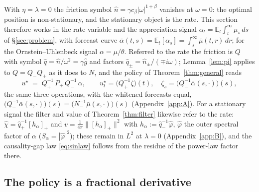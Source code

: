 \documentclass[11pt]{article}
\newcommand{\E}{\mathbb{E}}
\newcommand{\pluspart}[1]{\left[#1\right]_+}
\theoremstyle{plain}
\theoremstyle{definition}
\theoremstyle{remark}
\begin{document}
With $\eta=\lambda=0$ the friction symbol $\hat n=\gamma c_\beta|\omega|^{1+\beta}$ vanishes at $\omega=0$: the optimal position is non-stationary, and the stationary object is the rate. This section therefore works in the rate variable and the appreciation signal $\alpha_t=\E_t\int_t^\infty\mu_s\,ds$ of \S\ref{sec:problem}, with forecast curve $\bar\alpha(t,s)=\E_t[\alpha_s]=\int_s^\infty\bar\mu(t,r)\,dr$; for the Ornstein--Uhlenbeck signal $\alpha=\mu/\theta$. Referred to the rate the friction is $Q$ with symbol $\hat q=\hat n/\omega^2=\gamma\hat g$ and factors $\hat q_\pm=\hat n_\pm/(\mp i\omega)$; Lemma~\ref{lem:pi} applies to $Q=Q_-Q_+$ as it does to $N$, and the policy of Theorem~\ref{thm:general} reads
\begin{equation}\label{eq:rate-policy}
u^\star \;=\; Q_+^{-1}\,P_+\,Q_-^{-1}\,\alpha,
\qquad
u^\star_t=\bigl(Q_+^{-1}\zeta\bigr)(t),\quad \zeta_s=\bigl(Q_-^{-1}\bar\alpha(s,\cdot)\bigr)(s),
\end{equation}
the same three operations, with the whitened forecasts equal, $\bigl(Q_-^{-1}\bar\alpha(s,\cdot)\bigr)(s)=\bigl(N_-^{-1}\bar\mu(s,\cdot)\bigr)(s)$ (Appendix~\ref{app:A}). For a stationary signal the filter and value of Theorem~\ref{thm:filter} likewise refer to the rate: $\hat\chi=\hat q_+^{-1}\pluspart{h_\alpha}$ and $v=\frac{1}{4\pi}\|\pluspart{h_\alpha}\|^2$ with $h_\alpha:=\hat q_-^{-1}\hat\varphi$, $\hat\varphi$ the outer spectral factor of $\alpha$ ($S_\alpha=|\hat\varphi|^2$); these remain in $L^2$ at $\lambda=0$ (Appendix~\ref{app:B}), and the causality-gap law \eqref{eq:sinlaw} follows from the residue of the power-law factor there.

\subsection{The policy is a fractional derivative}\label{sec:fracpolicy}
\end{document}
